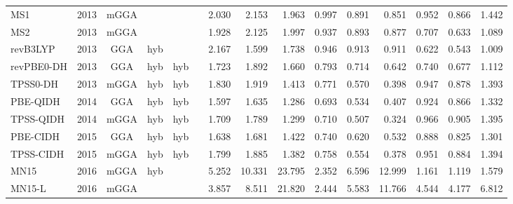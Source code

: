 \begin{landscape}
\begin{longtable}{lc:cccc:rrr:rrr:rrr}
    MS1              & 2013 & mGGA &          &             &           & 2.030             & 2.153             & 1.963  & 0.997              & 0.891             & 0.851  & 0.952   & 0.866 & 1.442 \\
    MS2              & 2013 & mGGA &          &             &           & 1.928             & 2.125             & 1.997  & 0.937              & 0.893             & 0.877  & 0.707   & 0.633 & 1.089 \\
    revB3LYP         & 2013 & GGA  & hyb      &             &           & 2.167             & 1.599             & 1.738  & 0.946              & 0.913             & 0.911  & 0.622   & 0.543 & 1.009 \\
    revPBE0-DH       & 2013 & GGA  & hyb      & hyb         &           & 1.723             & 1.892             & 1.660  & 0.793              & 0.714             & 0.642  & 0.740   & 0.677 & 1.112 \\
    TPSS0-DH         & 2013 & mGGA & hyb      & hyb         &           & 1.830             & 1.919             & 1.413  & 0.771              & 0.570             & 0.398  & 0.947   & 0.878 & 1.393 \\
    PBE-QIDH         & 2014 & GGA  & hyb      & hyb         &           & 1.597             & 1.635             & 1.286  & 0.693              & 0.534             & 0.407  & 0.924   & 0.866 & 1.332 \\
    TPSS-QIDH        & 2014 & mGGA & hyb      & hyb         &           & 1.709             & 1.789             & 1.299  & 0.710              & 0.507             & 0.324  & 0.966   & 0.905 & 1.395 \\
    PBE-CIDH         & 2015 & GGA  & hyb      & hyb         &           & 1.638             & 1.681             & 1.422  & 0.740              & 0.620             & 0.532  & 0.888   & 0.825 & 1.301 \\
    TPSS-CIDH        & 2015 & mGGA & hyb      & hyb         &           & 1.799             & 1.885             & 1.382  & 0.758              & 0.554             & 0.378  & 0.951   & 0.884 & 1.394 \\
    MN15             & 2016 & mGGA & hyb      &             &           & 5.252             & 10.331            & 23.795 & 2.352              & 6.596             & 12.999 & 1.161   & 1.119 & 1.579 \\
    MN15-L           & 2016 & mGGA &          &             &           & 3.857             & 8.511             & 21.820 & 2.444              & 5.583             & 11.766 & 4.544   & 4.177 & 6.812 \\

\end{longtable}
\end{landscape}

